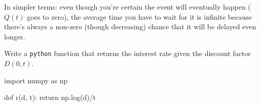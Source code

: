 \documentclass[12pt,a4paper]{exam}
\begin{document}
\begin{questions}
\begin{solution}
In simpler terms:  even though you're certain the event will eventually happen ($Q(t)$ goes to zero), the average time you have to wait for it is infinite because there's always a non-zero (though decreasing) chance that it will be delayed even longer.
\end{solution}

\question
Write a \texttt{python} function that returns the interest rate given the discount factor $D(0, t)$.
\makeemptybox{4cm}
\begin{solution}
  \begin{ipython}
import numpy as np

def r(d, t):
    return np.log(d)/t
  \end{ipython}
\end{solution}


\end{questions}
\end{document}
